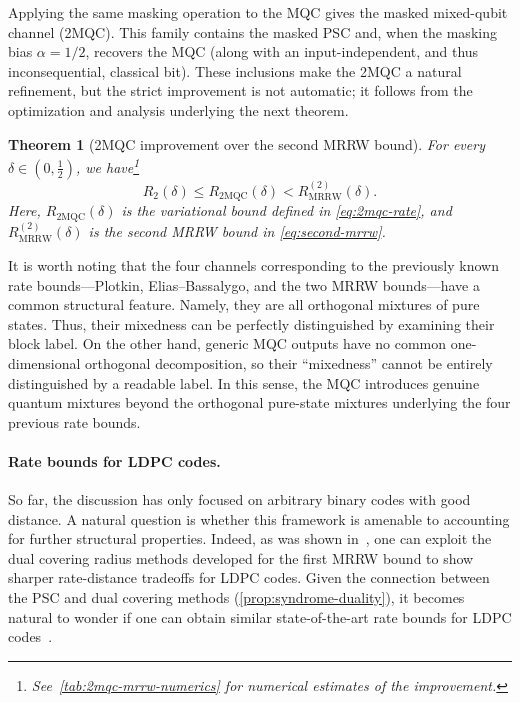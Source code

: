 \documentclass[11pt]{article}
\renewcommand{\leq}{\leqslant}
\newtheorem{theorem}{Theorem}
\theoremstyle{remark}
\newcommand{\MRRW}{R_{\mathrm{MRRW}}}
\newcommand{\mMQC}{2\mathrm{MQC}}
\begin{document}
Applying the same masking operation to the MQC gives the masked mixed-qubit channel (2MQC). This family contains the masked PSC and, when the masking bias $\alpha = 1/2$, recovers the MQC (along with an input-independent, and thus inconsequential, classical bit). These inclusions make the 2MQC a natural refinement, but the strict improvement is not automatic; it follows from the optimization and analysis underlying the next theorem.

\begin{theorem}[2MQC improvement over the second MRRW bound]
\label{thm:second-mrrw-improvement}
For every $\delta \in (0,\frac{1}{2})$, we have\footnote{See~\cref{tab:2mqc-mrrw-numerics} for numerical estimates of the improvement.}
\begin{equation*}
R_2(\delta) \leq R_{\mMQC}(\delta) < \MRRW^{(2)}(\delta).
\end{equation*}
Here, $R_{\mMQC}(\delta)$ is the variational bound defined in \eqref{eq:2mqc-rate}, and $\MRRW^{(2)}(\delta)$ is the second MRRW bound in \eqref{eq:second-mrrw}.
\end{theorem}

It is worth noting that the four channels corresponding to the previously known rate bounds---Plotkin, Elias--Bassalygo, and the two MRRW bounds---have a common structural feature. Namely, they are all orthogonal mixtures of pure states. Thus, their mixedness can be perfectly distinguished by examining their block label. On the other hand, generic MQC outputs have no common one-dimensional orthogonal decomposition, so their ``mixedness'' cannot be entirely distinguished by a readable label. In this sense, the MQC introduces genuine quantum mixtures beyond the orthogonal pure-state mixtures underlying the four previous rate bounds.

\paragraph{Rate bounds for LDPC codes.}
So far, the discussion has only focused on arbitrary binary codes with good distance. A natural question is whether this framework is amenable to accounting for further structural properties. Indeed, as was shown in~\cite{IS15,SY26}, one can exploit the dual covering radius methods developed for the first MRRW bound to show sharper rate-distance tradeoffs for LDPC codes. Given the connection between the PSC and dual covering methods (\cref{prop:syndrome-duality}), it becomes natural to wonder if one can obtain similar state-of-the-art rate bounds for LDPC codes~\cite{SY26}.
\end{document}
